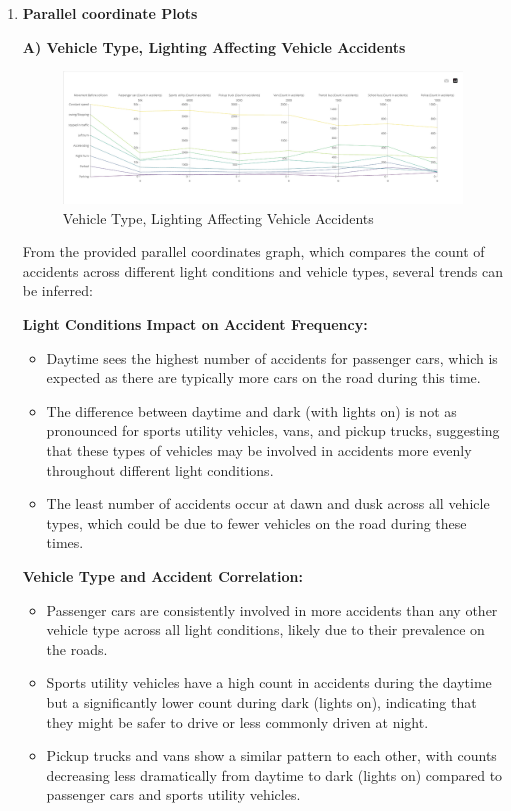 \documentclass[conference]{IEEEtran}
\begin{document}
\begin{enumerate}
\item \textbf{Parallel coordinate Plots}

\textbf{A) Vehicle Type, Lighting Affecting Vehicle Accidents}

\begin{figure}
    \centering
    \includegraphics[width=1\linewidth]{pic1.png}
    \caption{Vehicle Type, Lighting Affecting Vehicle Accidents}
    \label{fig:enter-label}
\end{figure}

From the provided parallel coordinates graph, which compares the count of accidents across different light conditions and vehicle types, several trends can be inferred:

\textbf{Light Conditions Impact on Accident Frequency:}
\begin{itemize}
    \item Daytime sees the highest number of accidents for passenger cars, which is expected as there are typically more cars on the road during this time.
    \item The difference between daytime and dark (with lights on) is not as pronounced for sports utility vehicles, vans, and pickup trucks, suggesting that these types of vehicles may be involved in accidents more evenly throughout different light conditions.
    \item The least number of accidents occur at dawn and dusk across all vehicle types, which could be due to fewer vehicles on the road during these times.
\end{itemize}

\textbf{Vehicle Type and Accident Correlation:}

\begin{itemize}
    \item Passenger cars are consistently involved in more accidents than any other vehicle type across all light conditions, likely due to their prevalence on the roads.
    \item Sports utility vehicles have a high count in accidents during the daytime but a significantly lower count during dark (lights on), indicating that they might be safer to drive or less commonly driven at night.
    \item Pickup trucks and vans show a similar pattern to each other, with counts decreasing less dramatically from daytime to dark (lights on) compared to passenger cars and sports utility vehicles.
\end{itemize}


\end{enumerate}
\end{document}
